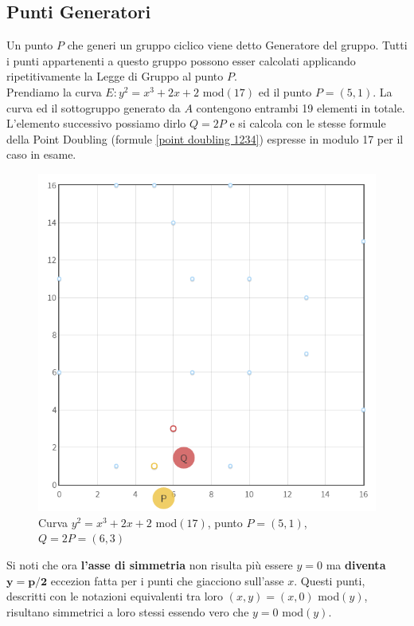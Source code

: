 \documentclass[a4paper,12pt]{tesiinfo}
\begin{document}
\subsection{Punti Generatori}
Un punto $P$ che generi un gruppo ciclico viene detto Generatore del gruppo. Tutti i punti appartenenti a questo gruppo possono esser calcolati applicando ripetitivamente la Legge di Gruppo al punto $P$. 
\\
Prendiamo la curva $E: y^2 = x^3 +2x +2$ mod$(17)$ ed il punto $P = (5, 1)$. La curva ed il sottogruppo generato da $A$ contengono entrambi 19 elementi in totale. L'elemento successivo possiamo dirlo $Q=2P$ e si calcola con le stesse formule della Point Doubling (formule \ref{point doubling 1234}) espresse in modulo 17 per il caso in esame.
\begin{figure}[H] 
    \includegraphics[scale=0.5, center]{PD_mod(17)} 
    \caption{Curva $y^2=x^3+2x+2$ mod$(17)$, punto $P = (5, 1)$, $Q=2P = (6, 3)$} 
\end{figure} 
Si noti che ora \textbf{l'asse di simmetria} non risulta pi\`u essere $y=0$ ma \textbf{diventa} $\mathbold{y=p\big / 2}$ eccezion fatta per i punti che giacciono sull'asse $x$. Questi punti, descritti con le notazioni equivalenti tra loro $(x, y)=(x, 0)$ mod$(y)$, risultano simmetrici a loro stessi essendo vero che $y=0$ mod$(y)$.
\\
\end{document}

